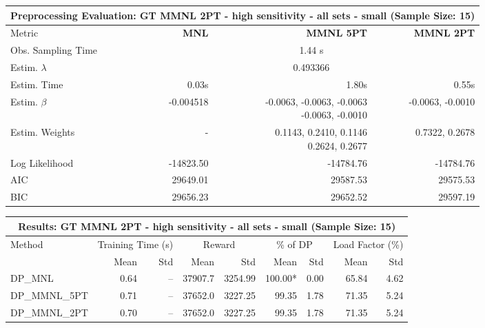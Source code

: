 
\begin{samepage}
\begin{center}
  \small
  \begin{tabular}{l|r|r|r}
    \toprule
    \multicolumn{4}{c}{\textbf{Preprocessing Evaluation: GT MMNL 2PT - high sensitivity - all sets - small (Sample Size: 15)}} \\
    \midrule
    Metric & \textbf{MNL} & \textbf{MMNL 5PT} & \textbf{MMNL 2PT} \\
    \midrule
    Obs. Sampling Time & \multicolumn{3}{c}{1.44 s} \\
    Estim. $\lambda$ & \multicolumn{3}{c}{0.493366} \\
    Estim. Time & 0.03s & 1.80s & 0.55s \\
    Estim. $\beta$ & -0.004518 & \makecell[tr]{-0.0063, -0.0063, -0.0063 \\ -0.0063, -0.0010} & -0.0063, -0.0010 \\
    Estim. Weights & - & \makecell[tr]{0.1143, 0.2410, 0.1146 \\ 0.2624, 0.2677} & 0.7322, 0.2678 \\
    Log Likelihood & -14823.50 & -14784.76 & -14784.76 \\
    AIC & 29649.01 & 29587.53 & 29575.53 \\
    BIC & 29656.23 & 29652.52 & 29597.19 \\
    \bottomrule
  \end{tabular}
\end{center}
\begin{center}
  \small
  \begin{tabular}{l|rr|rr|rr|rr}
    \toprule
    \multicolumn{9}{c}{\textbf{Results: GT MMNL 2PT - high sensitivity - all sets - small (Sample Size: 15)}} \\
    \midrule
    Method & \multicolumn{2}{c|}{Training Time (s)} & \multicolumn{2}{c|}{Reward} & \multicolumn{2}{c|}{\% of DP} & \multicolumn{2}{c}{Load Factor (\%)} \\
    & Mean & Std & Mean & Std & Mean & Std & Mean & Std \\
    \midrule
    DP\_MNL      &     0.64 &    -- &    37907.7 &    3254.99 & 100.00* &    0.00 &   65.84 &    4.62 \\
    DP\_MMNL\_5PT &     0.71 &    -- &    37652.0 &    3227.25 &   99.35 &    1.78 &   71.35 &    5.24 \\
    DP\_MMNL\_2PT &     0.70 &    -- &    37652.0 &    3227.25 &   99.35 &    1.78 &   71.35 &    5.24 \\

\end{tabular}
\end{center}
\end{samepage}
